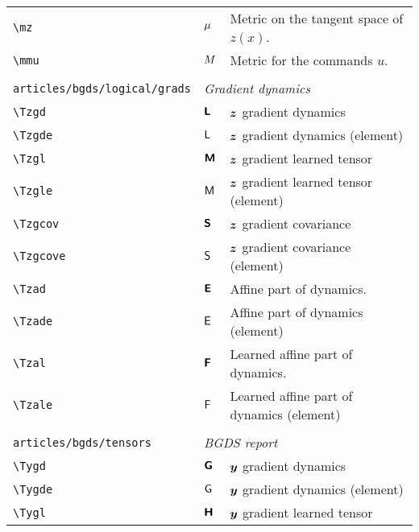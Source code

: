 \begin{longtable}{lll}
 {\color[rgb]{0.5,0.5,0.5}\texttt{\textbackslash mz}} & $\mu$ &  Metric on the tangent space of $z(x)$.\\ 
 {\color[rgb]{0.5,0.5,0.5}\texttt{\textbackslash mmu}} & $M$ &  Metric for the commands $u$. \\ 
  &  & \\ 
 {\color[rgb]{0.5,0.5,0.5}\texttt{articles/bgds/logical/grads}} & \multicolumn{2}{l}{\emph{Gradient dynamics}}\\ 
 \hline
{\color[rgb]{0.5,0.5,0.5}\texttt{\textbackslash Tzgd}} & $\boldsymbol{{\mathsf{L}}}$ &  $\boldsymbol{z}$  gradient dynamics\\ 
 {\color[rgb]{0.5,0.5,0.5}\texttt{\textbackslash Tzgde}} & ${\mathsf{L}}$ &  $\boldsymbol{z}$  gradient dynamics (element)\\ 
 {\color[rgb]{0.5,0.5,0.5}\texttt{\textbackslash Tzgl}} & $\boldsymbol{{\mathsf{M}}}$ &  $\boldsymbol{z}$  gradient  learned tensor \\ 
 {\color[rgb]{0.5,0.5,0.5}\texttt{\textbackslash Tzgle}} & ${\mathsf{M}}$ &  $\boldsymbol{z}$  gradient  learned tensor (element)\\ 
 {\color[rgb]{0.5,0.5,0.5}\texttt{\textbackslash Tzgcov}} & $\boldsymbol{{\mathsf{S}}}$ &  $\boldsymbol{z}$  gradient  covariance\\ 
 {\color[rgb]{0.5,0.5,0.5}\texttt{\textbackslash Tzgcove}} & ${\mathsf{S}}$ &  $\boldsymbol{z}$  gradient  covariance (element)\\ 
 {\color[rgb]{0.5,0.5,0.5}\texttt{\textbackslash Tzad}} & $\boldsymbol{{\mathsf{E}}}$ &  Affine part of dynamics.\\ 
 {\color[rgb]{0.5,0.5,0.5}\texttt{\textbackslash Tzade}} & ${\mathsf{E}}$ &  Affine part of dynamics (element)\\ 
 {\color[rgb]{0.5,0.5,0.5}\texttt{\textbackslash Tzal}} & $\boldsymbol{{\mathsf{F}}}$ &  Learned affine part of dynamics.\\ 
 {\color[rgb]{0.5,0.5,0.5}\texttt{\textbackslash Tzale}} & ${\mathsf{F}}$ &  Learned affine part of dynamics (element)\\ 
  &  & \\ 
 {\color[rgb]{0.5,0.5,0.5}\texttt{articles/bgds/tensors}} & \multicolumn{2}{l}{\emph{BGDS report}}\\ 
 \hline
{\color[rgb]{0.5,0.5,0.5}\texttt{\textbackslash Tygd}} & $\boldsymbol{{\mathsf{G}}}$ &  $\boldsymbol{y}$ gradient dynamics\\ 
 {\color[rgb]{0.5,0.5,0.5}\texttt{\textbackslash Tygde}} & ${\mathsf{G}}$ &  $\boldsymbol{y}$ gradient dynamics (element)\\ 
 {\color[rgb]{0.5,0.5,0.5}\texttt{\textbackslash Tygl}} & $\boldsymbol{{\mathsf{H}}}$ &  $\boldsymbol{y}$ gradient learned tensor \\ 

\end{longtable}
